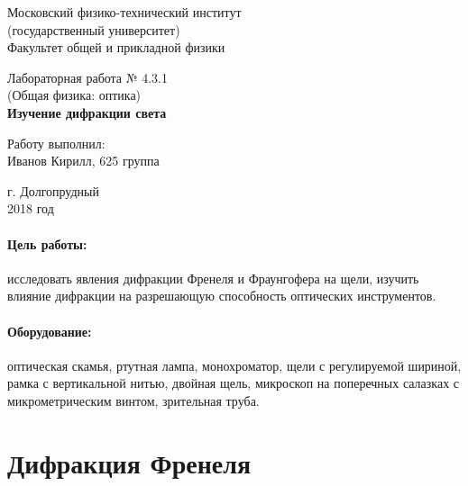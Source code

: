 \documentclass[12pt]{kiarticle} %
\begin{document}
	
	\begin{titlepage}
	\begin{center}
		\large 	Московский физико-технический институт \\
		(государственный университет) \\
		Факультет общей и прикладной физики \\
		\vspace{0.2cm}
		
		\vspace{4.5cm}
		Лабораторная работа № 4.3.1 \\ \vspace{0.2cm}
		\large (Общая физика: оптика) \\ \vspace{0.2cm}
		\LARGE \textbf{Изучение дифракции света}
	\end{center}
	\vspace{2.3cm} \large
	
	\begin{center}
		Работу выполнил: \\
		Иванов Кирилл,
		625 группа
		\vspace{10mm}		
		
	\end{center}
	
	\begin{center} \vspace{60mm}
		г. Долгопрудный \\
		2018 год
	\end{center}
\end{titlepage}
	
	\paragraph*{Цель работы:} исследовать явления дифракции Френеля и Фраунгофера на щели, изучить влияние дифракции на разрешающую способность оптических инструментов.
	
	\paragraph*{Оборудование:} оптическая скамья, ртутная лампа, монохроматор, щели с регулируемой шириной, рамка с вертикальной
нитью, двойная щель, микроскоп на поперечных салазках с микрометрическим винтом, зрительная труба.

	\section{Дифракция Френеля}
	
\end{document}
